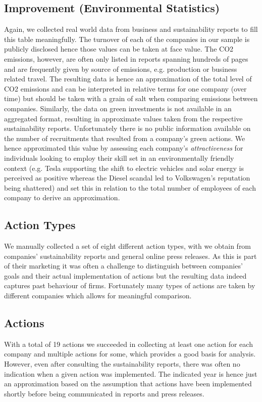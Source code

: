 \subsection{Improvement (Environmental Statistics)}
Again, we collected real world data from business and sustainability reports to fill this table meaningfully.
The turnover of each of the companies in our sample is publicly disclosed hence those values can be taken at face value.
The CO2 emissions, however, are often only listed in reports spanning hundreds of pages and are frequently given by source of
emissions, e.g. production or business related travel.
The resulting data is hence an approximation of the total level of CO2 emissions and can be interpreted in relative terms
for one company (over time) but should be taken with a grain of salt when comparing emissions between companies.
Similarly, the data on green investments is not available in an aggregated format, resulting in approximate values taken
from the respective sustainability reports.
Unfortunately there is no public information available on the number of recruitments that resulted from a company's green
actions.
We hence approximated this value by assessing each company's \textit{attractiveness} for individuals looking to employ
their skill set in an environmentally friendly context (e.g. Tesla supporting the shift to electric vehicles and solar
energy is perceived as positive whereas the Diesel scandal led to Volkswagen's reputation being shattered) and set this
in relation to the total number of employees of each company to derive an approximation.

\subsection{Action Types}
We manually collected a set of eight different action types, with we obtain from companies' sustainability reports and
general online press releases.
As this is part of their marketing it was often a challenge to distinguish between companies' goals and their actual
implementation of actions but the resulting data indeed captures past behaviour of firms.
Fortunately many types of actions are taken by different companies which allows for meaningful comparison.

\subsection{Actions}
With a total of 19 actions we succeeded in collecting at least one action for each company and multiple actions for some,
which provides a good basis for analysis.
However, even after consulting the sustainability reports, there was often no indication when a given action was implemented.
The indicated year is hence just an approximation based on the assumption that actions have been implemented shortly before being
communicated in reports and press releases.

